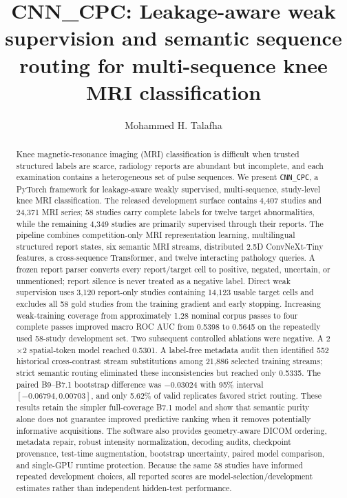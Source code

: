 \documentclass[preprint,12pt]{elsarticle}
\newcommand{\code}[1]{\texttt{#1}}
\begin{document}
\begin{frontmatter}

\title{CNN\_CPC: Leakage-aware weak supervision and semantic sequence routing for multi-sequence knee MRI classification}

\author[a]{Mohammed H. Talafha}
\address[a]{Research Institute of Sciences and Engineering, University of Sharjah, Sharjah, United Arab Emirates}

\begin{abstract}
Knee magnetic-resonance imaging (MRI) classification is difficult when trusted structured labels are scarce, radiology reports are abundant but incomplete, and each examination contains a heterogeneous set of pulse sequences. We present \code{CNN\_CPC}, a PyTorch framework for leakage-aware weakly supervised, multi-sequence, study-level knee MRI classification. The released development surface contains 4,407 studies and 24,371 MRI series; 58 studies carry complete labels for twelve target abnormalities, while the remaining 4,349 studies are primarily supervised through their reports. The pipeline combines competition-only MRI representation learning, multilingual structured report states, six semantic MRI streams, distributed 2.5D ConvNeXt-Tiny features, a cross-sequence Transformer, and twelve interacting pathology queries. A frozen report parser converts every report/target cell to positive, negated, uncertain, or unmentioned; report silence is never treated as a negative label. Direct weak supervision uses 3,120 report-only studies containing 14,123 usable target cells and excludes all 58 gold studies from the training gradient and early stopping. Increasing weak-training coverage from approximately 1.28 nominal corpus passes to four complete passes improved macro ROC AUC from 0.5398 to 0.5645 on the repeatedly used 58-study development set. Two subsequent controlled ablations were negative. A 2$\times$2 spatial-token model reached 0.5301. A label-free metadata audit then identified 552 historical cross-contrast stream substitutions among 21,886 selected training streams; strict semantic routing eliminated these inconsistencies but reached only 0.5335. The paired B9--B7.1 bootstrap difference was $-0.03024$ with 95\% interval $[-0.06794,0.00703]$, and only 5.62\% of valid replicates favored strict routing. These results retain the simpler full-coverage B7.1 model and show that semantic purity alone does not guarantee improved predictive ranking when it removes potentially informative acquisitions. The software also provides geometry-aware DICOM ordering, metadata repair, robust intensity normalization, decoding audits, checkpoint provenance, test-time augmentation, bootstrap uncertainty, paired model comparison, and single-GPU runtime protection. Because the same 58 studies have informed repeated development choices, all reported scores are model-selection/development estimates rather than independent hidden-test performance.


\end{abstract}
\end{frontmatter}
\end{document}
